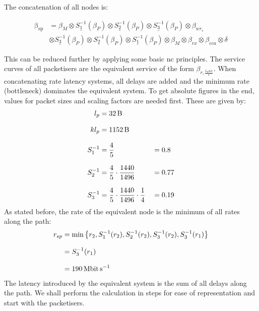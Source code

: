 The concatenation of all nodes is:

\begin{equation}
\begin{aligned}
\mathrm{\beta_{sp}} &=   \beta_{M} \otimes \underline{S^{-1}_1} \left ( \beta_{P}\right) \otimes \underline{S^{-1}_2} \left ( \beta_{P}\right) \otimes \underline{S^{-1}_3} \left ( \beta_{P} \right) \otimes \beta_{wr_s}\\
&\otimes  \underline{S^{-1}_3} \left ( \beta_{P}\right)  \otimes \underline{S^{-1}_2} \left ( \beta_{P} \right) \otimes \underline{S^{-1}_1} \left ( \beta_{P} \right) \otimes   \beta_{M} \otimes \beta_{rx} \otimes \beta_{eca} \otimes \delta
\label{eq:sp-serv}
\end{aligned}
\end{equation}

This can be reduced further by applying some basic \gls{nc} principles. The service curves of all packetisers are the equivalent service of the form $\beta_{r,\frac{l_max}{r}}$. When concatenating rate latency systems, all delays are added and
the minimum rate (bottleneck) dominates the equivalent system.
To get absolute figures in the end, values for packet sizes and scaling factors are needed first. These are given by:
\begin{equation}
\begin{aligned}
l_p &= \SI{32}{\byte}&&~\\[8pt]
kl_p &= \SI{1152}{\byte}&&~\\[8pt]
S^{-1}_1 &= \frac{4}{5} &&= 0.8\\[8pt]
S^{-1}_2 &= \frac{4}{5}\cdot \frac{1440}{1496} &&= 0.77\\[8pt]
S^{-1}_3 &= \frac{4}{5}\cdot \frac{1440}{1496} \cdot \frac{1}{4} &&= 0.19
\label{eq:scalings}
\end{aligned}
\end{equation}
%
As stated before, the rate of the equivalent node is the minimum of all rates along the path:
%
\begin{equation}
\begin{aligned}
r_{sp} &= \min\left\{r_2, S^{-1}_1(r_2), S^{-1}_2(r_2), S^{-1}_3(r_2), S^{-1}_3(r_1) \right\}\\[8pt]
 &= S^{-1}_3(r_1)\\[8pt]
 &= \SI{190}{\mega\bit\per\second}
\end{aligned}
\end{equation}
%
The latency introduced by the equivalent system is the sum of all delays along the path. We shall perform the calculation in steps for ease of representation and start with the packetisers.

